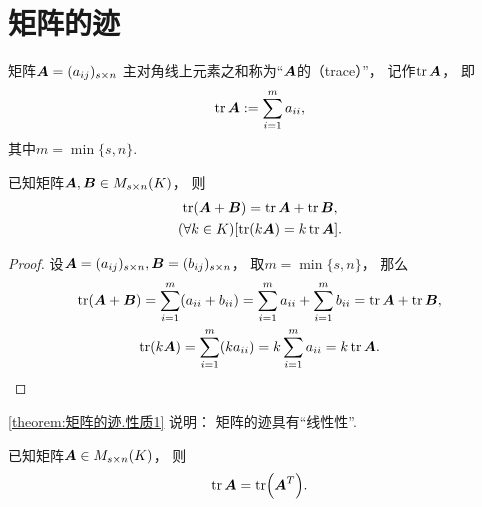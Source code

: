 \section{矩阵的迹}
\begin{definition}
矩阵\(\boldsymbol{A}=(a_{ij})_{s \times n}\)
主对角线上元素之和称为“\(\boldsymbol{A}\)的（trace）”，
记作\(\tr\boldsymbol{A}\)，
即\begin{equation*}
	\tr\boldsymbol{A}
	:=
	\sum_{i=1}^m a_{ii},
\end{equation*}
其中\(m = \min\{s,n\}\).
\end{definition}

\begin{property}\label{theorem:矩阵的迹.性质1}
已知矩阵\(\boldsymbol{A},\boldsymbol{B} \in M_{s \times n}(K)\)，
则\begin{gather}
	\tr(\boldsymbol{A}+\boldsymbol{B}) = \tr\boldsymbol{A} + \tr\boldsymbol{B}, \\
	(\forall k \in K)[\tr(k \boldsymbol{A}) = k \tr\boldsymbol{A}].
\end{gather}
\begin{proof}
设\(\boldsymbol{A}=(a_{ij})_{s \times n},
\boldsymbol{B}=(b_{ij})_{s \times n}\)，
取\(m = \min\{s,n\}\)，
那么\begin{gather*}
	\tr(\boldsymbol{A}+\boldsymbol{B}) = \sum_{i=1}^m (a_{ii}+b_{ii})
	= \sum_{i=1}^m a_{ii}
	+ \sum_{i=1}^m b_{ii}
	= \tr\boldsymbol{A} + \tr\boldsymbol{B}, \\
	\tr(k \boldsymbol{A}) = \sum_{i=1}^m (k a_{ii})
	= k \sum_{i=1}^m a_{ii}
	= k \tr\boldsymbol{A}.
	\qedhere
\end{gather*}
\end{proof}
\end{property}
\begin{remark}
\cref{theorem:矩阵的迹.性质1} 说明：
矩阵的迹具有“线性性”.
\end{remark}

\begin{property}\label{theorem:矩阵的迹.矩阵转置不变迹}
已知矩阵\(\boldsymbol{A} \in M_{s \times n}(K)\)，
则\begin{equation}
	\tr\boldsymbol{A} = \tr(\boldsymbol{A}^T).
\end{equation}
\end{property}

